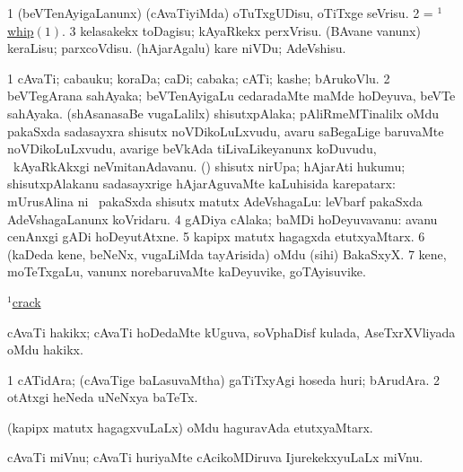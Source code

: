 \noindent 
\gl{\pagu}
\expl{}
\bmng
\bnum
\num{1}  (beVTenAyigaLanunx) (cAvaTiyiMda) oTuTxgUDisu, oTiTxge seVrisu. 
\num{2}  = \hyperlink{whip(1)}{$^1$whip\((1)\)}. 
\num{3}  kelasakekx toDagisu; kAyaRkekx perxVrisu. 
  
\banum
{} (BAvane \mo vanunx) keraLisu; parxcoVdisu. 
 (hAjarAgalu) kare niVDu; AdeVshisu. 
\eanum
\numie
\enum
\emng
\eentry

\bentry
{} 
\gl{\nA}
\expl{}
\bmng
\bnum
\num{1} cAvaTi; cabauku; koraDa; caDi; cabaka; cATi; kashe; bArukoVlu. 
\num{2} beVTegArana sahAyaka; beVTenAyigaLu cedaradaMte maMde hoDeyuva, beVTe sahAyaka. 
 (shAsanasaBe \mo vugaLalilx) 
\banum
{} shisutxpAlaka; pAliRmeMTinalilx oMdu pakaSxda sadasayxra shisutx noVDikoLuLxvudu, avaru saBegaLige baruvaMte noVDikoLuLxvudu, avarige beVkAda tiLivaLikeyanunx koDuvudu, \mo\ kAyaRkAkxgi neVmitanAdavanu. 
 (\birx) shisutx nirUpa; hAjarAti hukumu; shisutxpAlakanu sadasayxrige hAjarAguvaMte kaLuhisida karepatarx:  mUrusAlina ni\rUpa\ 
 pakaSxda shisutx matutx AdeVshagaLu:  leVbarf pakaSxda AdeVshagaLanunx koVridaru. 
\eanum
\numie
\num{4} gADiya cAlaka; baMDi hoDeyuvavanu:  avanu cenAnxgi gADi hoDeyutAtxne. 
\num{5} kapipx matutx hagagxda etutxyaMtarx. 
\num{6} (kaDeda kene, beNeNx, \mo vugaLiMda tayArisida) oMdu (sihi) BakaSxyX. 
\num{7} kene, moTeTxgaLu, \mo vanunx norebaruvaMte kaDeyuvike, goTAyisuvike. 
\enum
\emng

\noindent
\gl{\pagu}
\expl{}
\bmng
{} \hyperref{kandict_c.pdf}{C}{crac(1) nuga(3)}{$^1$crack}  
\emng
\eentry

\bentry
{} 
\gl{\nA}
\expl{}
\bmng
cAvaTi hakikx; cAvaTi hoDedaMte kUguva, soVphaDisf  kulada, AseTxrXVliyada oMdu hakikx. 
\emng
\eentry

\bentry
{} 
\gl{\nA}
\expl{}
\bmng
\bnum
\num{1} cATidAra; (cAvaTige baLasuvaMtha) gaTiTxyAgi hoseda huri; bArudAra. 
\num{2} otAtxgi heNeda uNeNxya baTeTx. 
\enum
\emng
\eentry

\bentry
{} 
\gl{\nA}
\expl{}
\bmng
(kapipx matutx hagagxvuLaLx) oMdu haguravAda etutxyaMtarx. 
\emng
\eentry

\bentry
{} 
\gl{\nA}
\expl{}
\bmng
cAvaTi miVnu; cAvaTi huriyaMte cAcikoMDiruva IjurekekxyuLaLx miVnu. 
\emng
\eentry

